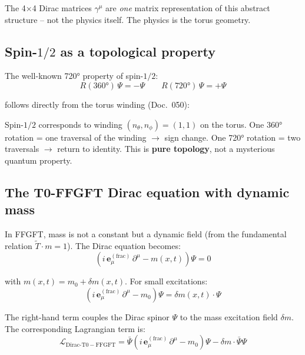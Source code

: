 The 4×4 Dirac matrices $\gamma^\mu$ are \emph{one} matrix representation
of this abstract structure -- not the physics itself. The physics is
the torus geometry.

\subsection{Spin-$1/2$ as a topological property}

The well-known 720° property of spin-$1/2$:
\begin{equation}
    R(360°)\,\Psi = -\Psi \qquad R(720°)\,\Psi = +\Psi
\end{equation}

follows directly from the torus winding (Doc.~050):

\begin{keybox}
Spin-$1/2$ corresponds to winding $(n_\theta, n_\phi) = (1,1)$ on
the torus. One 360° rotation = one traversal of the winding $\to$
sign change. One 720° rotation = two traversals $\to$ return to
identity. This is \textbf{pure topology}, not a mysterious quantum
property.
\end{keybox}

\subsection{The T0-FFGFT Dirac equation with dynamic mass}

In FFGFT, mass is not a constant but a dynamic field (from the
fundamental relation $\tilde{T}\cdot m = 1$). The Dirac equation becomes:
\begin{equation}
    \left(i\,\mathbf{e}_\mu^{(\mathrm{frac})}\,\partial^\mu
    - m(x,t)\right)\Psi = 0
\end{equation}

with $m(x,t) = m_0 + \delta m(x,t)$. For small excitations:
\begin{equation}
    \left(i\,\mathbf{e}_\mu^{(\mathrm{frac})}\,\partial^\mu - m_0\right)\Psi
    = \delta m(x,t)\cdot\Psi
\end{equation}

The right-hand term couples the Dirac spinor $\Psi$ to the mass
excitation field $\delta m$. The corresponding Lagrangian term is:
\begin{equation}
    \mathcal{L}_{\mathrm{Dirac\text{-}T0-FFGFT}}
    = \bar{\Psi}\left(i\,\mathbf{e}_\mu^{(\mathrm{frac})}\,\partial^\mu
    - m_0\right)\Psi - \delta m \cdot \bar{\Psi}\Psi
\end{equation}

